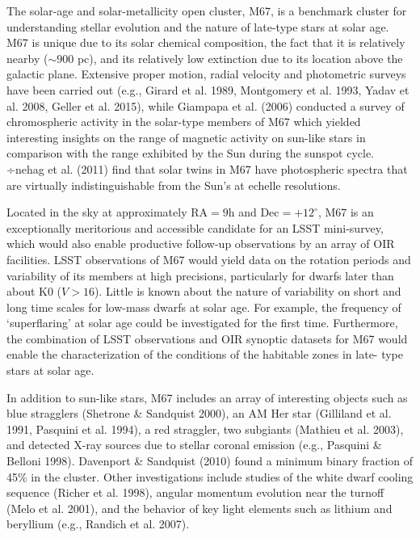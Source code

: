 The solar-age and solar-metallicity open cluster, M67, is a benchmark
cluster for understanding stellar evolution and the nature of late-type
stars at solar age. M67 is unique due to its solar chemical composition,
the fact that it is relatively nearby ($\sim900$ pc), and its relatively
low extinction due to its location above the galactic plane. Extensive
proper motion, radial velocity and photometric surveys have been carried
out (e.g., Girard et al. 1989, Montgomery et al. 1993, Yadav et al.
2008, Geller et al. 2015), while Giampapa et al. (2006) conducted
a survey of chromospheric activity in the solar-type members of M67
which yielded interesting insights on the range of magnetic activity
on sun-like stars in comparison with the range exhibited by the Sun
during the sunspot cycle. ÷nehag et al. (2011) find that solar twins
in M67 have photospheric spectra that are virtually indistinguishable
from the Sun\textquoteright{}s at echelle resolutions.

Located in the sky at approximately $\mathrm{RA}=9\mathrm{h}$ and
$\mathrm{Dec}=+12^{\circ}$, M67 is an exceptionally meritorious and
accessible candidate for an LSST mini-survey, which would also enable
productive follow-up observations by an array of OIR facilities. LSST
observations of M67 would yield data on the rotation periods and variability
of its members at high precisions, particularly for dwarfs later than
about K0 ($V>16$). Little is known about the nature of variability
on short and long time scales for low-mass dwarfs at solar age. For
example, the frequency of \textquoteleft{}superflaring\textquoteright{}
at solar age could be investigated for the first time. Furthermore,
the combination of LSST observations and OIR synoptic datasets for
M67 would enable the characterization of the conditions of the habitable
zones in late- type stars at solar age.

In addition to sun-like stars, M67 includes an array of interesting
objects such as blue stragglers (Shetrone \& Sandquist 2000), an AM
Her star (Gilliland et al. 1991, Pasquini et al. 1994), a red straggler,
two subgiants (Mathieu et al. 2003), and detected X-ray sources due
to stellar coronal emission (e.g., Pasquini \& Belloni 1998). Davenport
\& Sandquist (2010) found a minimum binary fraction of 45\% in the
cluster. Other investigations include studies of the white dwarf cooling
sequence (Richer et al. 1998), angular momentum evolution near the
turnoff (Melo et al. 2001), and the behavior of key light elements
such as lithium and beryllium (e.g., Randich et al. 2007).


